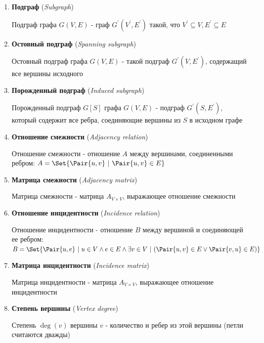 \documentclass[12pt]{article}
\begin{document}
\begin{enumerate}
        \item \textbf{Подграф} (\textit{Subgraph})

        Подграф графа $G(V, E)$ - граф $G^\prime(V^\prime, E^\prime)$
        такой, что $V^\prime \subseteq V, E^\prime \subseteq E$

        \item \textbf{Остовный подграф} (\textit{Spanning subgraph})

        Остовный подграф графа $G(V, E)$ - такой подграф $G^\prime(V, E^\prime)$, содержащий все вершины исходного


        \item \textbf{Порожденный подграф} (\textit{Induced subgraph})

        Порожденный подграф $G[S]$ графа $G(V, E)$ - подграф $G^\prime(S, E^\prime)$, который содержит все ребра, соединяющие вершины из $S$ в исходном графе

        \item \textbf{Отношение смежности} (\textit{Adjacency relation})

        Отношение смежности - отношение $A$ между вершинами, соединенными ребром: $A = \Set{\Pair{u, v} \ | \ \Pair{u, v} \in E}$

        \item \textbf{Матрица смежности} (\textit{Adjacency matrix})

        Матрица смежности - матрица $A_{V\times V}$, выражающее отношение смежности


        \item \textbf{Отношение инцидентности} (\textit{Incidence relation})

        Отношение инцидентности - отношение $B$ между вершиной и соединяющей ее ребром: $B = \Set{\Pair{u, e} \ | \ u \in V \land e \in E \land \exists v \in V \ | \ (\Pair{u, v} \in E \lor \Pair{v, u} \in E)}$

        \item \textbf{Матрица инцидентности} (\textit{Incidence matrix})

        Матрица инцидентности - матрица $A_{V\times V}$, выражающее отношение инцидентности


        \item \textbf{Степень вершины} (\textit{Vertex degree})

        Степень $\deg(v)$ вершины $v$ - количество и ребер из этой вершины (петли считаются дважды)


\end{enumerate}
\end{document}
